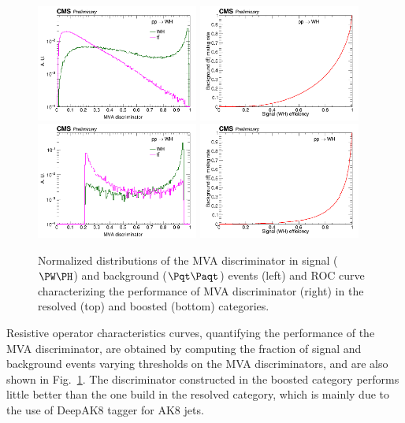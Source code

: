 \documentclass[a4paper,11pt]{article}
\newcommand{\Pt}{{{\Pqt}}\xspace}
\newcommand{\PAt}{{{{\Paqt}}}\xspace}
\begin{document}
\begin{figure}[hbtp]
\begin{center}
\includegraphics[width=0.475\textwidth]{Figures/RECO/Plot_WH_MVA_WH_fast_resolved.png}
\includegraphics[width=0.475\textwidth]{Figures/RECO/ROC_plot_TT_MVA_resolved.png}
\includegraphics[width=0.475\textwidth]{Figures/RECO/Plot_WH_MVA_WH_fast_boosted.png}
\includegraphics[width=0.475\textwidth]{Figures/RECO/ROC_plot_TT_MVA_boosted.png}
\end{center}
\caption{
Normalized distributions of the MVA discriminator in signal ($\PW\PH$) and background ($\Pt\PAt$) events (left) and ROC curve characterizing the performance of MVA discriminator (right) in the resolved (top) and boosted (bottom) categories.
}
\label{fig:MVA}
\end{figure}
Resistive operator characteristics curves, quantifying the performance of the MVA discriminator, are obtained by computing the fraction of signal and background events varying thresholds on the MVA discriminators, and are also shown in Fig.~\ref{fig:MVA}. 
The discriminator constructed in the boosted category performs little better than the one build in the resolved category, 
which is mainly due to the use of DeepAK8 tagger for AK8 jets.
\end{document}
